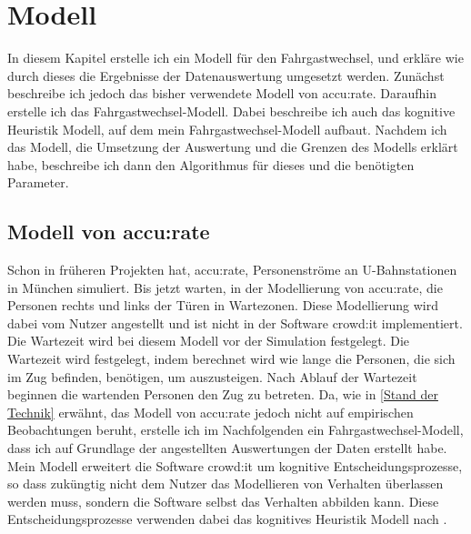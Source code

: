 \chapter{Modell} \label{Modell}
In diesem Kapitel erstelle ich ein Modell für den Fahrgastwechsel, und erkläre wie durch dieses die Ergebnisse der Datenauswertung umgesetzt werden. Zunächst beschreibe ich jedoch das bisher verwendete Modell von accu:rate. Daraufhin erstelle ich das Fahrgastwechsel-Modell. Dabei beschreibe ich auch das kognitive Heuristik Modell, auf dem mein Fahrgastwechsel-Modell aufbaut. Nachdem ich das Modell, die Umsetzung der Auswertung und die Grenzen des Modells erklärt habe, beschreibe ich dann den Algorithmus für dieses und die benötigten Parameter.
\section{Modell von accu:rate} \label{Accurate Modell}
Schon in früheren Projekten hat, accu:rate, Personenströme an U-Bahnstationen in München simuliert. Bis jetzt warten, in der Modellierung von accu:rate, die Personen rechts und links der Türen in Wartezonen. Diese Modellierung wird dabei vom Nutzer angestellt und ist nicht in der Software crowd:it implementiert. Die Wartezeit wird bei diesem Modell vor der Simulation festgelegt. Die Wartezeit wird festgelegt, indem berechnet wird wie lange die Personen, die sich im Zug befinden, benötigen, um auszusteigen. Nach Ablauf der Wartezeit beginnen die wartenden Personen den Zug zu betreten. Da, wie in \ref{Stand der Technik} erwähnt, das Modell von accu:rate jedoch nicht auf empirischen Beobachtungen beruht, erstelle ich im Nachfolgenden ein Fahrgastwechsel-Modell, dass ich auf Grundlage der angestellten Auswertungen der Daten erstellt habe. Mein Modell erweitert die Software crowd:it um kognitive Entscheidungsprozesse, so dass zuküngtig nicht dem Nutzer das Modellieren von Verhalten überlassen werden muss, sondern die Software selbst das Verhalten abbilden kann. Diese Entscheidungsprozesse verwenden dabei das kognitives Heuristik Modell nach \cite{Seitz.2016}. 
